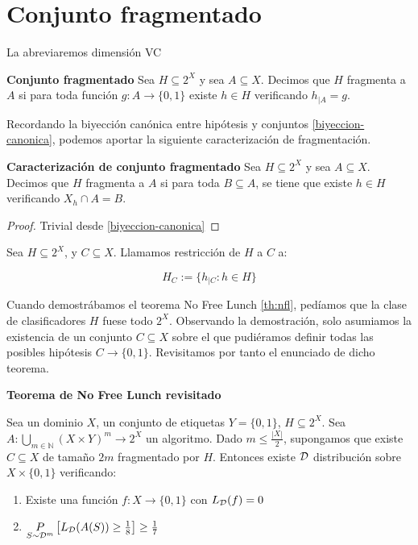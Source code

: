 \section{Conjunto fragmentado}
La abreviaremos dimensión VC

\begin{definition} \textbf{Conjunto fragmentado}
 Sea $H\subseteq 2^X$ y sea $A\subseteq X$. Decimos que $H$ fragmenta a $A$ si para toda función $g:A\rightarrow \{0,1\}$ 
 existe $h\in H$ verificando $h_{|A} = g$.
\end{definition}

Recordando la biyección canónica entre hipótesis y conjuntos \ref{biyeccion-canonica}, podemos aportar la siguiente 
caracterización de fragmentación.

\begin{fact} \textbf{Caracterización de conjunto fragmentado}
 Sea $H\subseteq 2^X$ y sea $A\subseteq X$. Decimos que $H$ fragmenta a $A$ si para toda $B\subseteq A$, se tiene que existe
 $h\in H$ verificando $X_h \cap A = B$.
\end{fact}

  \begin{proof}
  Trivial desde \ref{biyeccion-canonica}
  \end{proof}


\begin{definition}
Sea $H\subseteq 2^X$, y $C \subseteq X$. Llamamos restricción de $H$ a $C$ a:

\[H_{C} := \{h_{|C} : h\in H\}\]
\end{definition}


Cuando demostrábamos el teorema No Free Lunch \ref{th:nfl}, pedíamos que la clase de clasificadores $H$ fuese todo $2^X$. 
Observando la demostración, solo asumiamos la existencia de un conjunto $C\subseteq X$ sobre el que pudiéramos definir 
todas las posibles hipótesis $C \rightarrow \{0,1\}$. Revisitamos por tanto el enunciado de dicho teorema.

\begin{theorem}
\textbf{Teorema de No Free Lunch revisitado}

Sea un dominio $X$, un conjunto de etiquetas $Y=\{0,1\}$, $H \subseteq 2^X$.
Sea $A: \underset{m\in \mathbb{N}}{\bigcup} (X\times Y)^m \rightarrow 2^X$ un algoritmo. Dado $m \le \frac{|X|}{2}$,
supongamos que existe $C\subseteq X$ de tamaño $2m$ fragmentado por $H$. Entonces existe $\mathcal{D}$ distribución sobre 
$X\times \{0,1\}$ verificando:

\begin{enumerate}[i]
\item Existe una función $f: X \rightarrow \{0,1\}$ con $L_{\mathcal{D}}(f)=0$
\item $\underset{S\sim \mathcal{D}^m}{P} \left[ L_{\mathcal{D}}(A(S)) \ge \frac{1}{8} \right] \ge \frac{1}{7}$
\end{enumerate}

\label{th:nfl2}
\end{theorem}


